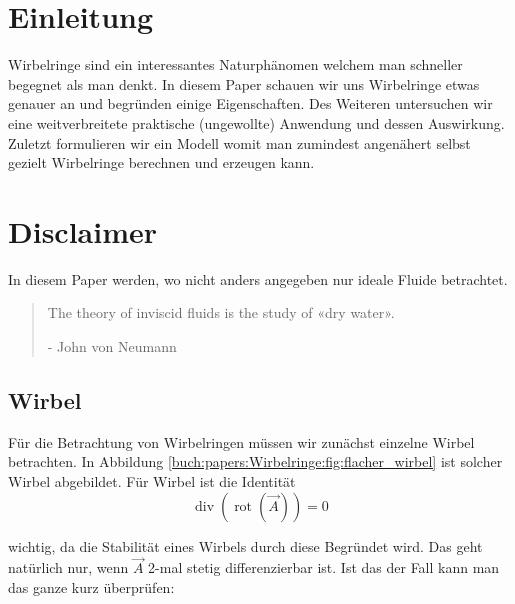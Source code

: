 %
%
%
\section{Einleitung}



Wirbelringe sind ein interessantes Naturphänomen welchem man schneller begegnet als man denkt. 
In diesem Paper schauen wir uns Wirbelringe etwas genauer an und begründen einige Eigenschaften. 
Des Weiteren untersuchen wir eine weitverbreitete praktische (ungewollte) Anwendung und dessen Auswirkung. 
Zuletzt formulieren wir ein Modell womit man zumindest angenähert selbst gezielt Wirbelringe berechnen und erzeugen kann.

\section*{Disclaimer}

In diesem Paper werden, wo nicht anders angegeben nur ideale Fluide betrachtet.

\begin{quote}
    The theory of inviscid fluids is the study of «dry water».

    - John von Neumann \cite{Wirbelringe:feynman1964lectures}
\end{quote}

\subsection{Wirbel}



Für die Betrachtung von Wirbelringen müssen wir zunächst einzelne Wirbel betrachten. 
In Abbildung \ref{buch:papers:Wirbelringe:fig:flacher_wirbel} ist solcher Wirbel abgebildet. 
Für Wirbel ist die Identität
\begin{equation}
    \label{paper:Wirbelringe:eq:wIdent}
\operatorname{div} \left( \operatorname{rot} \left( \vec{A} \right) \right) 
= 
0
\end{equation}

wichtig, da die Stabilität eines Wirbels durch diese Begründet wird.  
Das geht natürlich nur, wenn \(\vec{A}\) 2-mal stetig differenzierbar ist. 
Ist das der Fall kann man das ganze kurz überprüfen:

